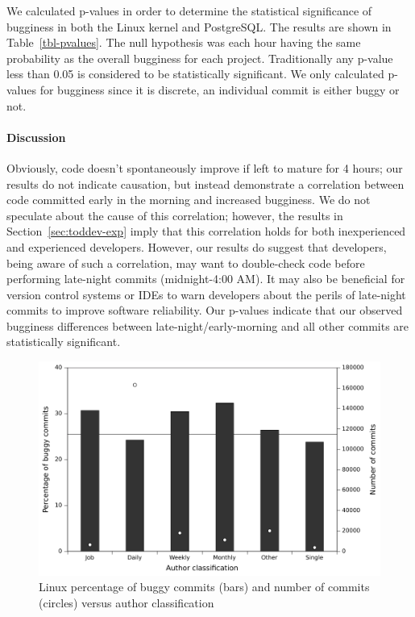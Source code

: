 We calculated p-values in order to determine the statistical significance of
bugginess in both the Linux kernel and PostgreSQL. The results are shown in
Table~\ref{tbl-pvalues}. The null hypothesis was each hour having the same
probability as the overall bugginess for each project. Traditionally any p-value
less than 0.05 is considered to be statistically significant. We only calculated
p-values for bugginess since it is discrete, an individual commit is either
buggy or not.

\paragraph{Discussion}

Obviously, code doesn't spontaneously improve if left to mature for 4 hours; 
our results do not indicate causation,
but instead demonstrate a correlation between code committed early in the 
morning and increased bugginess. We do not speculate about the cause
of this correlation; however, the results in Section~\ref{sec:toddev-exp}
imply that this correlation holds for both inexperienced and experienced
developers.
However, our results do suggest that developers, being aware of such a 
correlation, may want to double-check code before performing
late-night commits (midnight-4:00 AM).  It may also be
beneficial for version control systems or IDEs to warn developers about
the perils of late-night
commits to improve software reliability. 
Our p-values indicate that our
observed bugginess differences between late-night/early-morning and all other commits are statistically significant.

\begin{figure}[t!hb]
\begin{center}
\includegraphics[width=\columnwidth]{linux-bugginess-author-class.pdf}
\end{center}
\caption{\label{fig-linux-bugginess-author-class}Linux percentage of buggy
  commits (bars) and number of commits (circles) versus author classification}
\end{figure}

